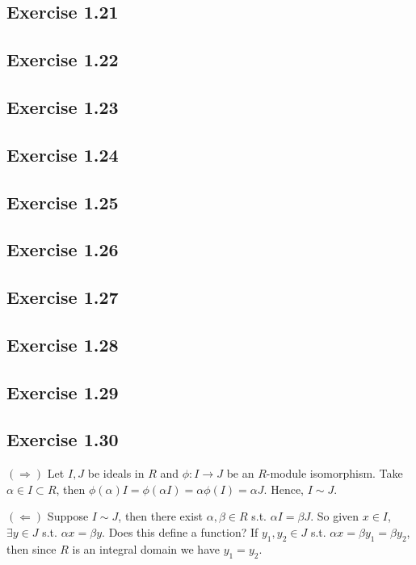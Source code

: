 \documentclass[../Chapter.tex]{subfiles}
\begin{document}
\subsection*{Exercise 1.21}

\subsection*{Exercise 1.22}

\subsection*{Exercise 1.23}

\subsection*{Exercise 1.24}

\subsection*{Exercise 1.25}

\subsection*{Exercise 1.26}

\subsection*{Exercise 1.27}

\subsection*{Exercise 1.28}

\subsection*{Exercise 1.29}

\subsection*{Exercise 1.30}

$(\Rightarrow)$ Let $I,J$ be ideals in $R$ and $\phi:I \to J$ be an $R$-module isomorphism. Take $\alpha\in I\subset R$, then $\phi(\alpha)I=\phi(\alpha I)=\alpha\phi(I)=\alpha J$. Hence, $I\sim J$.

$(\Leftarrow)$ Suppose $I\sim J$, then there exist $\alpha,\beta\in R$ s.t. $\alpha I=\beta J$. So given $x\in I$, $\exists y\in J$ s.t. $\alpha x=\beta y$. Does this define a function? If $y_1,y_2\in J$ s.t. $\alpha x=\beta y_1=\beta y_2$, then since $R$ is an integral domain we have $y_1=y_2$.
\end{document}
